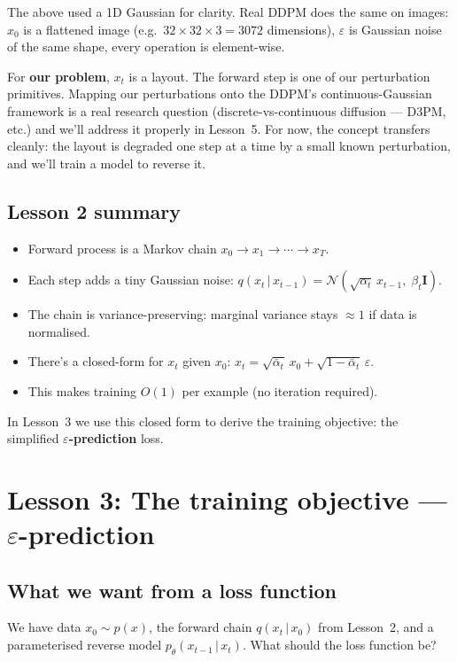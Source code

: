\documentclass[11pt,a4paper]{article}
\newcommand{\N}{\mathcal{N}}
\newcommand{\given}{\,|\,}
\newcommand{\eps}{\varepsilon}
\begin{document}
The above used a 1D Gaussian for clarity. Real DDPM does the same on
images: $x_0$ is a flattened image (e.g.\ $32\times32\times3 = 3072$
dimensions), $\eps$ is Gaussian noise of the same shape, every operation
is element-wise.

For \textbf{our problem}, $x_t$ is a layout. The forward step is one of
our perturbation primitives. Mapping our perturbations onto the
DDPM's continuous-Gaussian framework is a real research question
(discrete-vs-continuous diffusion --- D3PM, etc.) and we'll address it
properly in Lesson~5. For now, the concept transfers cleanly: the
layout is degraded one step at a time by a small known perturbation,
and we'll train a model to reverse it.

\subsection{Lesson 2 summary}

\begin{itemize}[leftmargin=*]
\item Forward process is a Markov chain $x_0 \to x_1 \to \cdots \to x_T$.
\item Each step adds a tiny Gaussian noise:
  $q(x_t \given x_{t-1}) = \N(\sqrt{\alpha_t}\, x_{t-1},\;\beta_t\mathbf{I})$.
\item The chain is variance-preserving: marginal variance stays $\approx 1$
  if data is normalised.
\item There's a closed-form for $x_t$ given $x_0$:
  $x_t = \sqrt{\bar{\alpha}_t}\, x_0 + \sqrt{1-\bar{\alpha}_t}\,\eps$.
\item This makes training $O(1)$ per example (no iteration required).
\end{itemize}

In Lesson~3 we use this closed form to derive the training objective:
the simplified \textbf{$\eps$-prediction} loss.

\section{Lesson 3: The training objective --- $\eps$-prediction}

\subsection{What we want from a loss function}

We have data $x_0 \sim p(x)$, the forward chain $q(x_t \given x_0)$ from
Lesson~2, and a parameterised reverse model $p_\theta(x_{t-1} \given x_t)$.
What should the loss function be?
\end{document}
